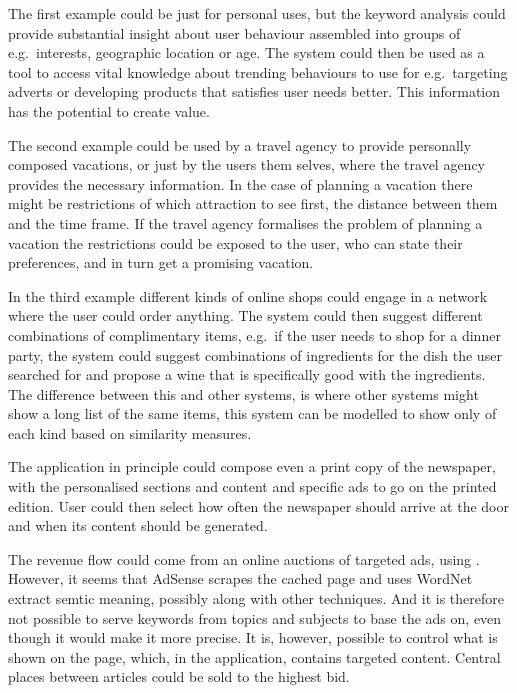 The first example could be just for personal uses, but the keyword analysis could provide substantial insight about user behaviour assembled into groups of e.g.\ interests, geographic location or age. The system could then be used as a tool to access vital knowledge about trending behaviours to use for e.g.\ targeting adverts or developing products that satisfies user needs better.
 This information has the potential to create value.

The second example could be used by a travel agency to provide personally composed vacations, or just by the users them selves, where the travel agency provides the necessary information. In the case of planning a vacation there might be restrictions of which attraction to see first, the distance between them and the time frame. If the travel agency formalises the problem of planning a vacation the restrictions could be exposed to the user, who can state their preferences, and in turn get a promising vacation.

In the third example different kinds of online shops could engage in a network where the user could order anything. The system could then suggest different combinations of complimentary items, e.g.\ if the user needs to shop for a dinner party, the system could suggest combinations of ingredients for the dish the user searched for and propose a wine that is specifically good with the ingredients. The difference between this and other systems, is where other systems might show a long list of the same items, this system can be modelled to show only of each kind based on similarity measures.

The application in principle could compose even a print copy of the newspaper, with the personalised sections and content and specific ads to go on the printed edition. User could then select how often the newspaper should arrive at the door and when its content should be generated.

The revenue flow could come from an online auctions of targeted ads, using \cite{AdSense}. However, it seems that AdSense scrapes the cached page and uses WordNet extract semtic meaning, possibly along with other techniques. And it is therefore not possible to serve keywords from topics and subjects to base the ads on, even though it would make it more precise. It is, however, possible to control what is shown on the page, which, in the application, contains targeted content. Central places between articles could be sold to the highest bid. 

